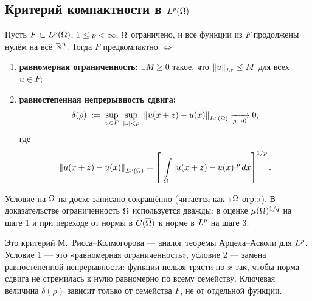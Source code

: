 \subsection{Критерий компактности в $L^{p}(\Omega)$}

\begin{theorem}\label{thm:compact}
Пусть $F \subset L^{p}(\Omega)$, $1 \le p < \infty$, $\Omega$ ограничено, и все функции из $F$
продолжены нулём на всё $\mathbb{R}^n$. Тогда $F$ предкомпактно $\iff$
\begin{enumerate}
  \item \textbf{равномерная ограниченность:} $\exists M \ge 0$ такое, что
        $\left\lVert u \right\rVert_{L^{p}} \le M$ для всех $u \in F$;
  \item \textbf{равностепенная непрерывность сдвига:}
        \[
          \delta(\rho) \;:=\; \sup_{u \in F}\ \sup_{|z| < \rho}\
          \left\lVert u(x+z) - u(x) \right\rVert_{L^{p}(\Omega)} \xrightarrow[\rho \to 0]{} 0 ,
        \]
        где
        \[
          \left\lVert u(x+z) - u(x) \right\rVert_{L^{p}(\Omega)}
          = \left[\ \int\limits_\Omega |u(x+z) - u(x)|^p\,dx \right]^{1/p} .
        \]
\end{enumerate}
\end{theorem}

\begin{warn}
Условие на $\Omega$ на доске записано сокращённо (читается как «$\Omega$ огр.»). В доказательстве
ограниченность $\Omega$ используется дважды: в оценке $\mu(\Omega)^{1/q}$ на шаге 1 и при переходе
от нормы в $C(\overline{\Omega})$ к норме в $L^{p}$ на шаге 3.
\end{warn}

\begin{idea}
Это критерий М.~Рисса--Колмогорова — аналог теоремы Арцела--Асколи для $L^{p}$. Условие 1 —
это «равномерная ограниченность», условие 2 — замена равностепенной непрерывности: функции
нельзя трясти по $x$ так, чтобы норма сдвига не стремилась к нулю равномерно по всему
семейству. Ключевая величина $\delta(\rho)$ зависит только от семейства $F$, не от отдельной
функции.
\end{idea}

